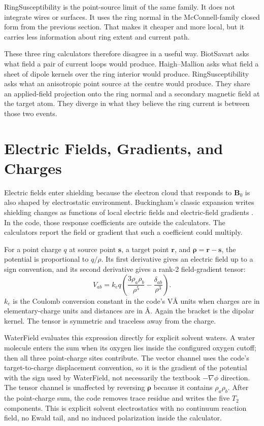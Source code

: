 \documentclass[11pt]{article}
\begin{document}
RingSusceptibility is the point-source limit of the same family. It does not
integrate wires or surfaces. It uses the ring normal in the McConnell-family
closed form from the previous section. That makes it cheaper and more local,
but it carries less information about ring extent and current path.

These three ring calculators therefore disagree in a useful way. BiotSavart
asks what field a pair of current loops would produce. Haigh--Mallion asks what
field a sheet of dipole kernels over the ring interior would produce.
RingSusceptibility asks what an anisotropic point source at the centre would
produce. They share an applied-field projection onto the ring normal and a
secondary magnetic field at the target atom. They diverge in what they believe
the ring current is between those two events.

\section{Electric Fields, Gradients, and Charges}

Electric fields enter shielding because the electron cloud that responds to
\(\bm B_0\) is also shaped by electrostatic environment. Buckingham's classic
expansion writes shielding changes as functions of local electric fields and
electric-field gradients \cite{buckingham1960}. In the code, those response
coefficients are outside the calculators. The calculators report the field or
gradient that such a coefficient could multiply.

For a point charge \(q\) at source point \(\bm s\), a target point \(\bm r\),
and \(\bm\rho=\bm r-\bm s\), the potential is proportional to \(q/\rho\). Its
first derivative gives an electric field up to a sign convention, and its
second derivative gives a rank-2 field-gradient tensor:
\[
  V_{ab}
  =
  k_e q
  \left(
    \frac{3\rho_a\rho_b}{\rho^5}
    -\frac{\delta_{ab}}{\rho^3}
  \right).
\]
\(k_e\) is the Coulomb conversion constant in the code's
\(\si{\volt\angstrom}\) units when charges are in elementary-charge units and
distances are in \(\si{\angstrom}\). Again the bracket is the dipolar kernel.
The tensor is symmetric and traceless away from the charge.

WaterField evaluates this expression directly for explicit solvent waters. A
water molecule enters the sum when its oxygen lies inside the configured oxygen
cutoff; then all three point-charge sites contribute. The vector channel uses
the code's target-to-charge displacement convention, so it is the gradient of
the potential with the sign used by WaterField, not necessarily the textbook
\(-\nabla\phi\) direction. The tensor channel is unaffected by reversing
\(\bm\rho\) because it contains \(\rho_a\rho_b\). After the point-charge sum,
the code removes trace residue and writes the five \(T_2\) components. This is
explicit solvent electrostatics with no continuum reaction field, no Ewald
tail, and no induced polarization inside the calculator.
\end{document}
